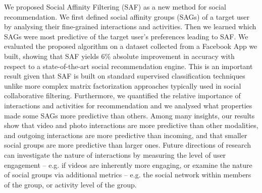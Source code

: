 
We proposed Social Affinity Filtering (SAF) as a new method for social
recommendation.  We first defined social affinity groups (SAGs) of a
target user by analysing their fine-grained interactions and
activities.  Then we learned which SAGs were most predictive of the
target user's preferences leading to SAF.  We evaluated the proposed
algorithm on a dataset collected from a Facebook App we built, showing
that SAF yields 6\% absolute improvement in accuracy with respect to a
state-of-the-art social recommendation engine.  This is an important
result given that SAF is built on standard supervised classification
techniques unlike more complex matrix factorization approaches
typically used in social collaborative filtering.  Furthermore, we
quantified the relative importance of interactions and activities for
recommendation and we analysed what properties made some SAGs
more predictive than others.  Among many insights, our results show
that video and photo interactions are more predictive than other
modalities, and outgoing interactions are more predictive than
incoming, and that smaller social groups are more predictive than
larger ones.  Future directions of research can investigate the nature
of interactions by measuring the level of user engagement -- e.g. if
videos are inherently more engaging, or examine the nature of social
groups via additional metrics -- e.g. the social network within
members of the group, or activity level of the group.


